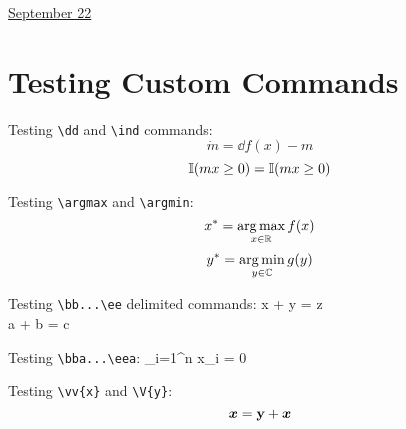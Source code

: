 \documentclass[11pt,letterpaper]{article}
\begin{document}
\href{run:2025-09-22-test.tex}{\Huge September 22} 

\section{Testing Custom Commands}

Testing \verb|\dd| and \verb|\ind| commands:
$$\dot m = \dd f(x) - m$$
$$\mathbb{I}(mx \geq 0) = \mathbb{I}(mx \geq 0)$$

Testing \verb|\argmax| and \verb|\argmin|:
$$x^* = \operatorname*{arg\,max}_{x \in \mathbb{R}} f(x)$$
$$y^* = \operatorname*{arg\,min}_{y \in \mathbb{C}} g(y)$$

Testing \verb|\bb...\ee| delimited commands:
\bb
x + y = z \\
a + b = c
\ee

Testing \verb|\bba...\eea|:
\bba
\label{eq:test}
\sum_{i=1}^n x_i = 0
\eea

Testing \verb|\vv{x}| and \verb|\V{y}|:
$$\boldsymbol{x} = \mathbf{y} + \boldsymbol{x}$$
\end{document}
